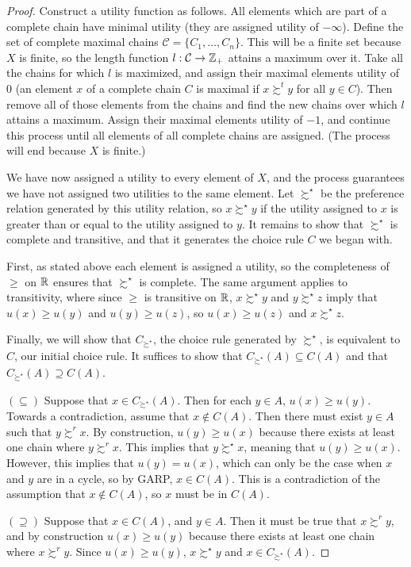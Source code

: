 \documentclass[12pt]{article}
\begin{document}
\begin{itemize}
\begin{proof}
        Construct a utility function as follows. All elements which are part of a complete chain have minimal utility (they are assigned utility of $-\infty$). Define the set of complete maximal chains $\mathcal{C} = \{C_1,\dots,C_n\}$. This will be a finite set because $X$ is finite, so the length function $l: \mathcal{C} \to \mathbb{Z}_+$ attains a maximum over it. Take all the chains for which $l$ is maximized, and assign their maximal elements utility of 0 (an element $x$ of a complete chain $C$ is maximal if $x \succsim^t y$ for all $y \in C$). Then remove all of those elements from the chains and find the new chains over which $l$ attains a maximum. Assign their maximal elements utility of $-1$, and continue this process until all elements of all complete chains are assigned. (The process will end because $X$ is finite.)

        We have now assigned a utility to every element of $X$, and the process guarantees we have not assigned two utilities to the same element. Let $\succsim^\star$ be the preference relation generated by this utility relation, so $x \succsim^\star y$ if the utility assigned to $x$ is greater than or equal to the utility assigned to $y$. It remains to show that $\succsim^\star$ is complete and transitive, and that it generates the choice rule $C$ we began with.

        First, as stated above each element is assigned a utility, so the completeness of $\ge$ on $\mathbb{R}$ ensures that $\succsim^\star$ is complete. The same argument applies to transitivity, where since $\ge$ is transitive on $\mathbb{R}$, $x \succsim^\star y$ and $y \succsim^\star z$ imply that $u(x) \ge u(y)$ and $u(y) \ge u(z)$, so $u(x) \ge u(z)$ and $x \succsim^\star z$.

        Finally, we will show that $C_{\succsim^\star}$, the choice rule generated by $\succsim^\star$, is equivalent to $C$, our initial choice rule. It suffices to show that $C_{\succsim^\star}(A) \subseteq C(A)$ and that $C_{\succsim^\star}(A) \supseteq C(A)$.

        $(\subseteq)$ Suppose that $x \in C_{\succsim^\star}(A)$. Then for each $y \in A$, $u(x) \ge u(y)$. Towards a contradiction, assume that $x \not\in C(A)$. Then there must exist $y \in A$ such that $y \succsim^r x$. By construction, $u(y) \ge u(x)$ because there exists at least one chain where $y \succsim^r x$. This implies that $y \succsim^\star x$, meaning that $u(y) \ge u(x)$. However, this implies that $u(y) = u(x)$, which can only be the case when $x$ and $y$ are in a cycle, so by GARP, $x \in C(A)$. This is a contradiction of the assumption that $x \not\in C(A)$, so $x$ must be in $C(A)$.

        $(\supseteq)$ Suppose that $x \in C(A)$, and $y \in A$. Then it must be true that $x \succsim^r y$, and by construction $u(x) \ge u(y)$ because there exists at least one chain where $x \succsim^r y$. Since $u(x) \ge u(y)$, $x \succsim^\star y$ and $x \in C_{\succsim^\star}(A)$. 

        
    \end{proof}

\end{itemize}
\end{document}
